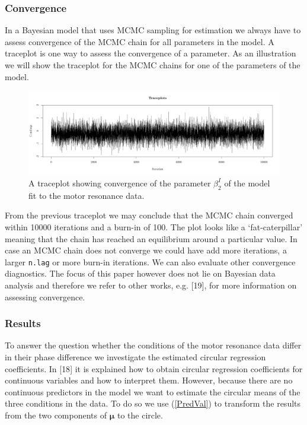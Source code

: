 \documentclass[11pt,]{article}
\begin{document}
\subsubsection{Convergence}

In a Bayesian model that uses MCMC sampling for estimation we always
have to assess convergence of the MCMC chain for all parameters in the
model. A traceplot is one way to assess the convergence of a parameter.
As an illustration we will show the traceplot for the MCMC chains for
one of the parameters of the model.

\begin{figure}
        \centering

\includegraphics[width=\textwidth]{traceplot.pdf}
       
        \caption{A traceplot showing convergence of the parameter $\beta_2^{I}$ of the model fit to the motor resonance data.}
        
        \label{traceplot}
        
\end{figure}

From the previous traceplot we may conclude that the MCMC chain
converged within 10000 iterations and a burn-in of 100. The plot looks
like a `fat-caterpillar' meaning that the chain has reached an
equilibrium around a particular value. In case an MCMC chain does not
converge we could have add more iterations, a larger \verb|n.lag| or
more burn-in iterations. We can also evaluate other convergence
diagnostics. The focus of this paper however does not lie on Bayesian
data analysis and therefore we refer to other works, e.g. {[}19{]}, for
more information on assessing convergence.

\subsubsection{Results}\label{ResMR}

To answer the question whether the conditions of the motor resonance
data differ in their phase difference we investigate the estimated
circular regression coefficients. In {[}18{]} it is explained how to
obtain circular regression coefficients for continuous variables and how
to interpret them. However, because there are no continuous predictors
in the model we want to estimate the circular means of the three
conditions in the data. To do so we use (\ref{PredVal}) to transform the
results from the two components of \(\boldsymbol{\mu}\) to the circle.
\end{document}
